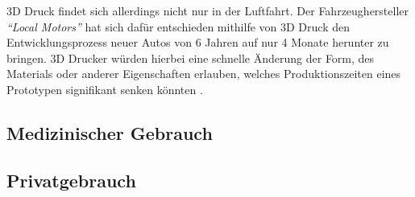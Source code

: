 3D Druck findet sich allerdings nicht nur in der Luftfahrt. Der Fahrzeughersteller \emph{\textquotedblleft Local Motors\textquotedblright} hat sich dafür entschieden mithilfe von 3D Druck den Entwicklungsprozess neuer Autos von 6 Jahren auf nur 4 Monate herunter zu bringen. 3D Drucker würden hierbei eine schnelle Änderung der Form, des Materials oder anderer Eigenschaften erlauben, welches Produktionszeiten eines Prototypen signifikant senken könnten \parencite{Local_Motor}.

\subsection{Medizinischer Gebrauch}
\subsection{Privatgebrauch}